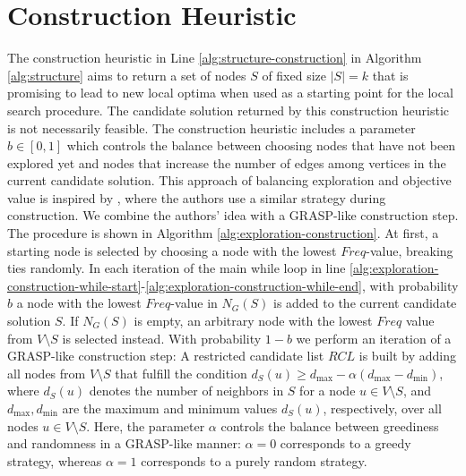 \documentclass[draft,final]{vutinfth} %
\begin{document}
\section{Construction Heuristic}\label{sec:construction-heuristic}

The construction heuristic in Line \ref{alg:structure-construction} in Algorithm \ref{alg:structure} aims to return a set of nodes $S$ of fixed size $|S| = k$ that is promising to lead to new local optima when used as a starting point for the local search procedure. The candidate solution returned by this construction heuristic is not necessarily feasible. 
The construction heuristic includes a parameter $b \in [0,1]$ which controls the balance between choosing nodes that have not been explored yet and nodes that increase the number of edges among vertices in the current candidate solution. This approach of balancing exploration and objective value is inspired by \cite{chen_nuqclq_2021}, where the authors use a similar strategy during construction. We combine the authors' idea with a GRASP-like construction step. The procedure is shown in Algorithm \ref{alg:exploration-construction}. 
At first, a starting node is selected by choosing a node with the lowest $\mathit{Freq}$-value, breaking ties randomly. In each iteration of the main while loop in line \ref{alg:exploration-construction-while-start}-\ref{alg:exploration-construction-while-end}, with probability $b$ a node with the lowest $\mathit{Freq}$-value in $N_G(S)$ is added to the current candidate solution $S$. If $N_G(S)$ is empty, an arbitrary node with the lowest $\mathit{Freq}$ value from $V\setminus S$ is selected instead. 
With probability $1-b$ we perform an iteration of a GRASP-like construction step: A restricted candidate list $\mathit{RCL}$ is built by adding all nodes from $V \setminus S$ that fulfill the condition $d_S(u) \geq d_{\max} - \alpha(d_{\max} - d_{\min})$, where $d_S(u)$ denotes the number of neighbors in $S$ for a node $u \in V \setminus S$, and $d_{\max}, d_{\min}$ are the maximum and minimum values $d_S(u)$, respectively, over all nodes $u\in V \setminus S$. Here, the parameter $\alpha$ controls the balance between greediness and randomness in a GRASP-like manner: $\alpha=0$ corresponds to a greedy strategy, whereas $\alpha=1$ corresponds to a purely random strategy.  
\end{document}
